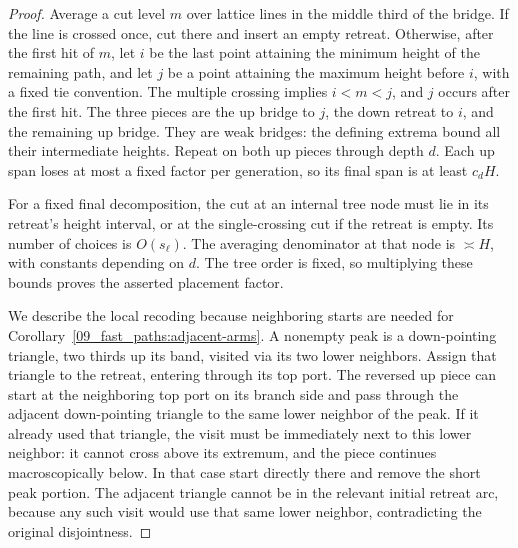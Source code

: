 \begin{proof}
Average a cut level \(m\) over lattice lines in the middle third of
the bridge.  If the line is crossed once, cut there and insert an empty
retreat.  Otherwise, after the first hit of \(m\), let \(i\) be the
last point attaining the minimum height of the remaining path, and
let \(j\) be a point attaining the maximum height before \(i\),
with a fixed tie convention.  The multiple crossing implies
\(i<m<j\), and \(j\) occurs after the first hit.  The three pieces
are the up bridge to \(j\), the down retreat to \(i\), and the
remaining up bridge.  They are weak bridges: the defining extrema
bound all their intermediate heights.  Repeat on both up pieces
through depth \(d\).  Each up span loses at most a fixed factor per
generation, so its final span is at least \(c_dH\).

For a fixed final decomposition, the cut at an internal tree node
must lie in its retreat's height interval, or at the single-crossing
cut if the retreat is empty.  Its number of choices is \(O(s_\ell)\).
The averaging denominator at that node is \(\asymp H\), with
constants depending on \(d\).  The tree order is fixed, so multiplying
these bounds proves the asserted placement factor.

We describe the local recoding because neighboring starts are needed
for Corollary~\ref{09_fast_paths:adjacent-arms}.  A nonempty peak is a
down-pointing triangle, two thirds up its band, visited via its two
lower neighbors.  Assign that triangle to the retreat, entering through
its top port.  The reversed up piece can start at the neighboring top
port on its branch side and pass through the adjacent down-pointing
triangle to the same lower neighbor of the peak.  If it already used
that triangle, the visit must be immediately next to this lower
neighbor: it cannot cross above its extremum, and the piece continues
macroscopically below.  In that case start directly there and remove
the short peak portion.  The adjacent triangle cannot be in the
relevant initial retreat arc, because any such visit would use that
same lower neighbor, contradicting the original disjointness.


\end{proof}
